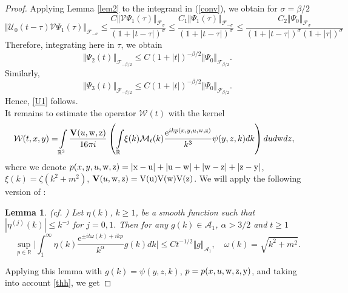 \documentclass[reqno]{amsart}
\newtheorem{lemma}[theorem]{Lemma}
\newcommand{\R}{{\mathbb R}}
\newcommand{\cF}{{\mathcal F}}
\newcommand{\cU}{{\mathcal U}}
\newcommand{\E}{\mathrm{e}}
\numberwithin{equation}{section}
\begin{document}
\begin{proof}
 Applying  Lemma \ref{lem2} to the integrand in (\ref{conv}), 
 we obtain for $\sigma=\beta/2$
 \begin{equation*}
 \Vert \cU_0(t-\tau){\mathcal V} \Psi_1(\tau)\Vert_{\cF_{-\sigma}}\le 
 \frac{C\Vert {\mathcal V} \Psi_1(\tau)\Vert_{\cF_{\sigma}}}{(1\!+|t-\!\tau|)^{\sigma}}
 \le\frac{C_1\Vert \Psi_1(\tau)\Vert_{\cF_{-\sigma}}}{(1\!+|t-\!\tau|)^{\sigma}}
  \le\!\frac{C_2\Vert \Psi_0\Vert_{\cF_{\sigma}}}{(1\!+|t-\!\tau|)^{\sigma}(1\!+|\tau|)^{\sigma}}
\end{equation*}  
Therefore, integrating here in $\tau$, we obtain 
\begin{equation*}
  \Vert \Psi_2(t)\Vert_{\cF_{-\beta/2}} \le C (1+|t|)^{-\beta/2}\Vert \Psi_0\Vert_{\cF_{\beta/2}}.
\end{equation*}
Similarly,
\begin{equation*}
  \Vert \Psi_3(t)\Vert_{\cF_{-\beta/2}} \le C (1+|t|)^{-\beta/2}\Vert \Psi_0\Vert_{\cF_{\beta/2}}.
\end{equation*}
Hence, \eqref{U1} follows.
\smallskip\\
It remains to estimate the operator  ${\mathcal W}(t)$ with the kernel
\begin{equation}\label{W}
\!\!\!\!\!{\mathcal W}(t,x,y)
=\!\int\limits_{\R^3} \frac{{\mathbf V}(u,\rm w,z)}{16 \pi i}\left(\int\limits_\R\! \xi(k){\mathcal M}_t(k)
\frac{\E^{ikp(x,y,u,\rm w,z)}}{k^3}\psi(y,z,k)dk\right) dud{\rm w} dz,
\end{equation}
where we denote  $p(x,y,u,\rm w,z)=|x-u|+|u-{\rm w}|+|{\rm w}-z|+|z-y|$,  $\xi(k)=\zeta(k^2+m^2)$,
${\mathbf V}(u,\rm w,z)=V(u)V(\rm w)V(z)$.
We will apply the following version of \cite[Lemma 2]{MSW}:
\begin{lemma}\label{l1} (cf. \cite[Lemma 5.5]{EKTM})
Let $\eta(k)$, $k\geq 1$, be a smooth function such that
 $|\eta^{(j)}(k)|\le k^{-j}$ for $j=0,1$. Then for any $g(k)\in \mathcal A_1$,
 $\alpha> 3/2$ and $t\ge 1$
\begin{equation}\label{OI-est}
\sup\limits_{p\in\R}\Big|\int_{1}^\infty\eta(k)\frac{\E^{\pm it\omega(k)+ ik p}}
{k^\alpha}g(k)dk\Big|\le C t^{-1/2}\Vert g\Vert_{\mathcal A_1} ,\quad \omega(k)=\sqrt{k^2+m^2}.
\end{equation}
\end{lemma}
Applying this lemma with  $g(k)=\psi(y,z,k)$, $p= p(x,u,\rm w,z,y)$, and taking into account \eqref{thh}, we get

\end{proof}
\end{document}
